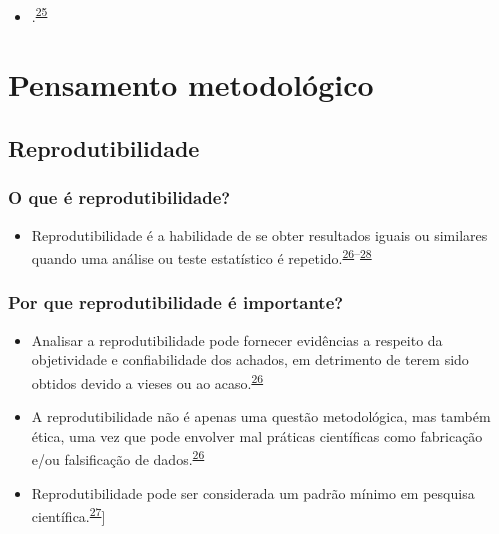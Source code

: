 \documentclass[
  a4paper,
]{book}
\providecommand{\tightlist}{%
  \setlength{\itemsep}{0pt}\setlength{\parskip}{0pt}}
\begin{document}
\begin{itemize}
\tightlist
\item
  .\textsuperscript{\protect\hyperlink{ref-feld1991}{25}}
\end{itemize}

\hypertarget{pensamento-metodologico}{%
\chapter{\texorpdfstring{\textbf{Pensamento metodológico}}{Pensamento metodológico}}\label{pensamento-metodologico}}

\hypertarget{reprodutibilidade}{%
\section{Reprodutibilidade}\label{reprodutibilidade}}

\hypertarget{o-que-uxe9-reprodutibilidade}{%
\subsection{O que é reprodutibilidade?}\label{o-que-uxe9-reprodutibilidade}}

\begin{itemize}
\tightlist
\item
  Reprodutibilidade é a habilidade de se obter resultados iguais ou similares quando uma análise ou teste estatístico é repetido.\textsuperscript{\protect\hyperlink{ref-resnik2016}{26}--\protect\hyperlink{ref-mair2016}{28}}
\end{itemize}

\hypertarget{por-que-reprodutibilidade-uxe9-importante}{%
\subsection{Por que reprodutibilidade é importante?}\label{por-que-reprodutibilidade-uxe9-importante}}

\begin{itemize}
\item
  Analisar a reprodutibilidade pode fornecer evidências a respeito da objetividade e confiabilidade dos achados, em detrimento de terem sido obtidos devido a vieses ou ao acaso.\textsuperscript{\protect\hyperlink{ref-resnik2016}{26}}
\item
  A reprodutibilidade não é apenas uma questão metodológica, mas também ética, uma vez que pode envolver mal práticas científicas como fabricação e/ou falsificação de dados.\textsuperscript{\protect\hyperlink{ref-resnik2016}{26}}
\item
  Reprodutibilidade pode ser considerada um padrão mínimo em pesquisa científica.\textsuperscript{\protect\hyperlink{ref-hofner2015}{27}}{]}
\end{itemize}
\end{document}
